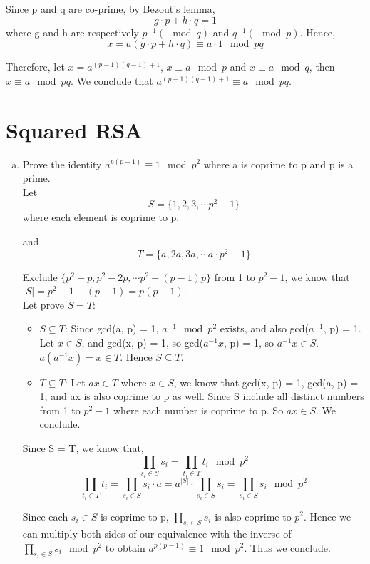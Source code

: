 \documentclass{article}
\begin{document}
Since p and q are co-prime, by Bezout’s lemma, 
\[g\cdot p + h\cdot q = 1\]
where g and h are respectively $p^{-1}(\mod{q})$ and $q^{-1}(\mod{p})$. Hence, 
\[x = a(g\cdot p + h\cdot q) \equiv a\cdot 1 \mod{pq}\]

Therefore, let $x = a^{(p-1)(q-1)+1}$, $x \equiv a \mod{p}$ and 
$x \equiv a \mod{q}$, then $x \equiv a \mod{pq}$. We conclude that $a^{(p-1)(q-1)+1} \equiv a \mod{pq}$. 

\part*{Squared RSA}
\begin{enumerate}[(a).]
    \item Prove the identity $a^{p(p-1)} \equiv 1 \mod{p^2}$ where 
    a is coprime to p and p is a prime.\\
    Let \[S = \{1, 2, 3, \cdots p^{2}-1\}\] where each element is coprime to p. 
    
    and \[T = \{a, 2a, 3a, \cdots a\cdot p^{2}-1\}\]

    Exclude $\{p^2-p, p^2-2p, \cdots p^2-(p-1)p\}$ from 1 to $p^{2}-1$, 
    we know that $|S| = p^2 - 1 - (p-1) = p(p-1)$.\\

    Let prove $S = T$:
    \begin{itemize}
        \item $S \subseteq T$: Since gcd(a, p) = 1, 
        $a^{-1} \mod{p^2}$ exists, and also gcd($a^{-1}$, p) = 1. 
        Let $x \in S$, and gcd(x, p) = 1, so gcd($a^{-1}x$, p) = 1, so $a^{-1}x \in S$. 
        $a(a^{-1}x) = x \in T$. Hence $S \subseteq T$.
        \item $T \subseteq T$: Let $ax \in T$ where $x \in S$, we know that 
        gcd(x, p) = 1, gcd(a, p) = 1, and ax is also coprime to p as well. 
        Since S include all distinct numbers from 1 to $p^{2}-1$ where each number is coprime to p. 
        So $ax \in S$. We conclude.
    \end{itemize}

    Since S = T, we know that, 
    \[ \prod\limits_{s_i \in S} s_i = \prod\limits_{t_i \in T} t_i \mod{p^2} \]
    \[ \prod\limits_{t_i \in T} t_i = \prod\limits_{s_i \in S} s_i\cdot a = a^{|S|}\cdot \prod\limits_{s_i \in S} s_i = \prod\limits_{s_i \in S} s_i \mod{p^2} \]

    Since each $s_i \in S$ is coprime to p, $\prod\limits_{s_i \in S} s_i$ is also coprime to $p^{2}$. 
    Hence we can multiply both sides of our equivalence with the inverse of $\prod\limits_{s_i \in S} s_i \mod{p^2}$ 
    to obtain $a^{p(p-1)} \equiv 1 \mod{p^2}$. Thus we conclude.


\end{enumerate}
\end{document}
